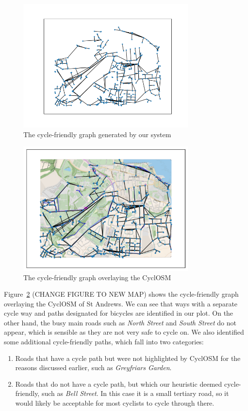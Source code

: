 \documentclass[12pt,a4paper]{report}
\begin{document}
\begin{figure}[ht]
    \centering
    \includegraphics[width=0.8\textwidth,trim={2.5cm 1.5cm 1.7cm 1.7cm},clip]{plan_images/cycle_friendly.png}
    \caption{The cycle-friendly graph generated by our system}
    \label{fig:cycle friendly graph}
\end{figure}

\begin{figure}[ht]
    \centering
    \includegraphics[width=0.8\textwidth,trim={1cm 1cm 1cm 1cm},clip]{plan_images/overlay_st_andrews.png}
    \caption{The cycle-friendly graph overlaying the CyclOSM}
    \label{fig:overlay st andrews}
\end{figure}

Figure~\ref{fig:overlay st andrews} (CHANGE FIGURE TO NEW MAP) shows the cycle-friendly graph overlaying the CyclOSM of St Andrews. We can see that ways with a separate cycle way and paths designated for bicycles are identified in our plot. On the other hand, the busy main roads such as \textit{North Street} and \textit{South Street} do not appear, which is sensible as they are not very safe to cycle on. We also identified some additional cycle-friendly paths, which fall into two categories: \begin{enumerate}
    \item Roads that have a cycle path but were not highlighted by CyclOSM for the reasons discussed earlier, such as \textit{Greyfriars Garden}.
    \item Roads that do not have a cycle path, but which our heuristic deemed cycle-friendly, such as \textit{Bell Street}. In this case it is a small tertiary road, so it would likely be acceptable for most cyclists to cycle through there.
\end{enumerate}
\end{document}
